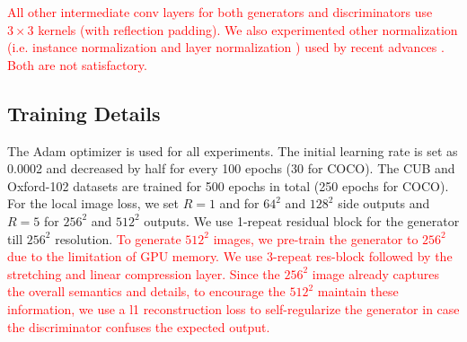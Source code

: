 \documentclass[10pt,twocolumn,letterpaper]{article}
\begin{document}
\textcolor{red}{All other intermediate conv layers for both generators and discriminators use $3{\times}3$ kernels (with reflection padding).
We also experimented other normalization (i.e. instance normalization \cite{ulyanov2016instance} and layer normalization \cite{ba2016layer}) used by recent advances \cite{zhu2017unpaired,chen2017photographic}. Both are not satisfactory. }



\subsection{Training Details}
The Adam optimizer is used for all experiments.  The initial learning rate is set as 0.0002 and decreased by half for every 100 epochs (30 for COCO). The CUB and Oxford-102 datasets are trained for 500 epochs in total (250 epochs for COCO).
For the local image loss, we set $R=1$ and for $64^2$ and $128^2$ side outputs and $R=5$ for $256^2$ and $512^2$ outputs.
We use 1-repeat residual block for the generator till $256^2$ resolution.
\textcolor{red}{To generate $512^2$ images, we pre-train the generator to $256^2$ due to the limitation of GPU memory. We use $3$-repeat res-block followed by the stretching and linear compression layer. 
Since the $256^2$ image already captures the overall semantics and details, to encourage the $512^2$ maintain these information, we use a l1 reconstruction loss to self-regularize the generator in case the discriminator confuses the expected output.}



\end{document}
